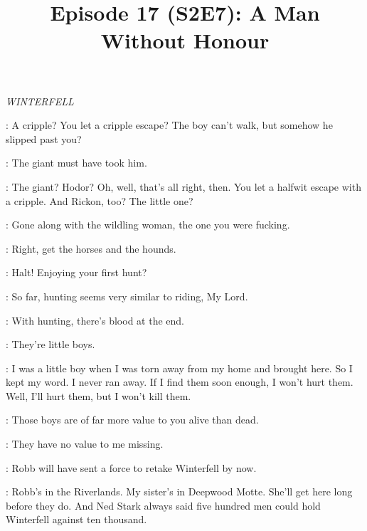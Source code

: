 

\title{Episode 17 (S2E7): A Man Without Honour}
\author{}
\date{}
\maketitle




\scene

\textit{WINTERFELL}


\THEON: A cripple? You let a cripple escape? The boy can't walk, but somehow he slipped past you?

\LORREN: The giant must have took him.

\THEON: The giant? Hodor? Oh, well, that's all right, then. You let a halfwit escape with a cripple. And Rickon, too? The little one?

\LORREN: Gone along with the wildling woman, the one you were fucking.


\THEON:  Right, get the horses and the hounds.


\THEON: Halt! Enjoying your first hunt?

\LUWIN: So far, hunting seems very similar to riding, My Lord.

\THEON: With hunting, there's blood at the end.

\LUWIN: They're little boys.

\THEON: I was a little boy when I was torn away from my home and brought here. So I kept my word. I never ran away. If I find them soon enough, I won't hurt them. Well, I'll hurt them, but I won't kill them.

\LUWIN: Those boys are of far more value to you alive than dead.

\THEON: They have no value to me missing.

\LUWIN: Robb will have sent a force to retake Winterfell by now.

\THEON: Robb's in the Riverlands. My sister's in Deepwood Motte. She'll get here long before they do. And Ned Stark always said five hundred men could hold Winterfell against ten thousand.

